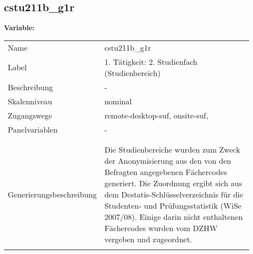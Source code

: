 	
	
	\subsection{cstu211b\_g1r}
	\label{subSection:cstu211b_g1r}

	\noindent\textbf{Variable:}\\
		\begin{tabular}{lL{11.3cm}}
			\label{tableVariable:cstu211b_g1r}
			Name & cstu211b\_g1r \\
			Label & 1. Tätigkeit: 2. Studienfach (Studienbereich) \\
			Beschreibung & - \\
			Skalenniveau & nominal \\
			Zugangswege &
				remote-desktop-suf,
				onsite-suf,
 \\
			Panelvariablen & -
			 \\
			 \\
 \\
					Generierungsbeschreibung & Die Studienbereiche wurden zum Zweck der Anonymisierung aus den von den Befragten angegebenen Fächercodes generiert. Die Zuordnung ergibt sich aus dem Destatis-Schlüsselverzeichnis für die Studenten- und Prüfungsstatistik (WiSe 2007/08). Einige darin nicht enthaltenen Fächercodes wurden vom DZHW vergeben und zugeordnet. 
				 \\	
			 \\
		\end{tabular}






